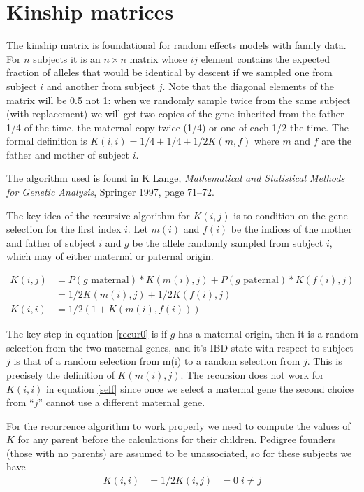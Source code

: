 \documentclass{article}
\begin{document}
\section{Kinship matrices}
The kinship matrix is foundational for random effects models with family
data.  
For $n$ subjects it is an $n \times n$ matrix whose $ij$ element contains
the expected fraction of alleles that would be identical by descent
if we sampled one from subject $i$ and another from subject $j$.
Note that the diagonal elements of the matrix will be 0.5 not 1: when we
randomly sample twice from the same subject (with replacement) 
we will get two copies of the gene inherited from the father 1/4 of the
time, the maternal copy twice (1/4) or one of each 1/2 the time.
The formal definition is $K(i,i) = 1/4 + 1/4 + 1/2 K(m,f)$ where
$m$ and $f$ are the father and mother of subject $i$.

The algorithm used is found in K Lange, 
\emph{Mathematical and Statistical  Methods for Genetic Analysis}, 
Springer 1997, page 71--72.

The key idea of the recursive algorithm for $K(i,j)$ is to condition on
the gene selection for the first index $i$.
Let $m(i)$ and $f(i)$ be the indices of the mother and father of subject $i$
and $g$ be the allele randomly sampled from subject $i$,
which may of either maternal or paternal origin.


\begin{align}
  K(i,j) &= P(\mbox{$g$ maternal}) * K(m(i), j) + 
            P(\mbox{$g$ paternal}) * K(f(i), j) \label{recur0} \\
         &= 1/2 K(m(i), j) + 1/2 K(f(i), j)   \label{recur1} \\
  K(i,i) &= 1/2(1 + K(m(i), f(i))) \label{self} 
\end{align}

The key step in equation \eqref{recur0} is if $g$ has a maternal origin, then
it is a random selection from the two maternal genes, and it's IBD state with
respect to subject $j$ is that of a random selection from m(i) to a random
selection from $j$.  This is precisely the definition of $K(m(i), j)$.
The recursion does not work for $K(i,i)$ in equation \eqref{self} since once 
we select a maternal gene the second choice from ``$j$'' cannot use a 
different maternal gene.


For the recurrence algorithm to work properly we need to compute the
values of $K$ for any parent before the calculations for their children.
Pedigree founders (those with no parents) are assumed to be unassociated,
so for these subjects we have
\begin{align*}
  K(i,i) &= 1/2
  K(i,j) &=0 \; i\ne j
\end{align*}
\end{document}
